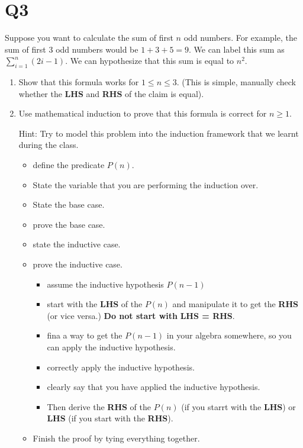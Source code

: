 \documentclass[12pt]{exam}
\begin{document}
\section{Q3}
Suppose you want to calculate the sum of first $n$ odd numbers. For example, the sum of first $3$ odd numbers would be $1 + 3 + 5 = 9$. We can label this sum as $\sum_{i=1}^{n} (2i - 1)$. We can hypothesize that this sum is equal to $n^2$.

\begin{enumerate}
    \item Show that this formula works for $1 \leq n \leq 3$. (This is simple, manually check whether the \textbf{LHS} and \textbf{RHS} of the claim is equal).
    \item Use mathematical induction to prove that this formula is correct for $n \geq 1$.

    Hint: Try to model this problem into the induction framework that we learnt during the class. 
    \begin{itemize}
        \item define the predicate $P(n)$.
        \item State the variable that you are performing the induction over.
        \item State the base case.
        \item prove the base case.
        \item state the inductive case.
        \item prove the inductive case.
            \begin{itemize}
                \item assume the inductive hypothesis $P(n-1)$
                \item start with the \textbf{LHS} of the $P(n)$ and manipulate it to get the \textbf{RHS} (or vice versa.) \textbf{Do not start with }\textbf{LHS = RHS}.
                \item fina a way to get the $P(n-1)$ in your algebra somewhere, so you can apply the inductive hypothesis.
                \item correctly apply the inductive hypothesis.
                \item clearly say that you have applied the inductive hypothesis.
                \item Then derive the \textbf{RHS} of the $P(n)$ (if you starrt with the \textbf{LHS}) or \textbf{LHS} (if you start with the \textbf{RHS}).
            \end{itemize}
        \item Finish the proof by tying everything together.
    \end{itemize}
\end{enumerate}
\end{document}
